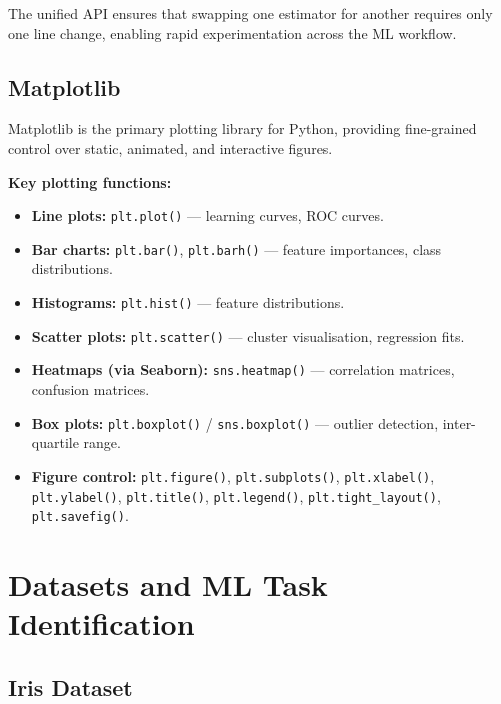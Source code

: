 \documentclass[12pt,a4paper]{article}
\begin{document}
The unified API ensures that swapping one estimator for another requires only one line change,
enabling rapid experimentation across the ML workflow.

\subsection{Matplotlib}

Matplotlib is the primary plotting library for Python, providing fine-grained control over
static, animated, and interactive figures.

\textbf{Key plotting functions:}
\begin{itemize}[noitemsep]
  \item \textbf{Line plots:} \texttt{plt.plot()} --- learning curves, ROC curves.
  \item \textbf{Bar charts:} \texttt{plt.bar()}, \texttt{plt.barh()} ---
        feature importances, class distributions.
  \item \textbf{Histograms:} \texttt{plt.hist()} --- feature distributions.
  \item \textbf{Scatter plots:} \texttt{plt.scatter()} --- cluster visualisation,
        regression fits.
  \item \textbf{Heatmaps (via Seaborn):} \texttt{sns.heatmap()} --- correlation matrices,
        confusion matrices.
  \item \textbf{Box plots:} \texttt{plt.boxplot()} / \texttt{sns.boxplot()} ---
        outlier detection, inter-quartile range.
  \item \textbf{Figure control:} \texttt{plt.figure()}, \texttt{plt.subplots()},
        \texttt{plt.xlabel()}, \texttt{plt.ylabel()}, \texttt{plt.title()},
        \texttt{plt.legend()}, \texttt{plt.tight\_layout()},
        \texttt{plt.savefig()}.
\end{itemize}

\section{Datasets and ML Task Identification}

\subsection{Iris Dataset}
\end{document}
